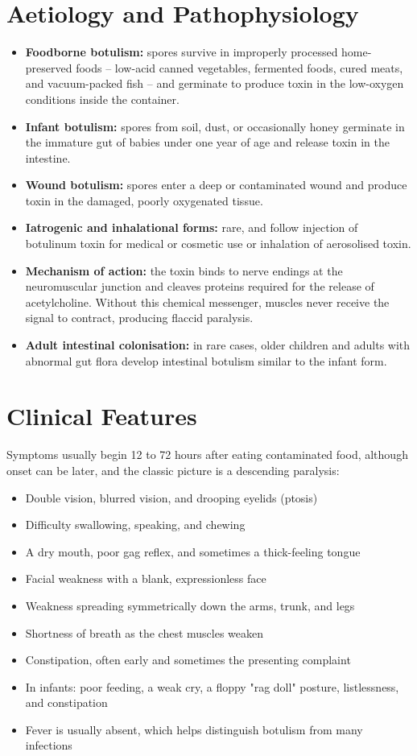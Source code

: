 \section*{Aetiology and Pathophysiology}
\begin{itemize}
    \item \textbf{Foodborne botulism:} spores survive in improperly processed home-preserved foods -- low-acid canned vegetables, fermented foods, cured meats, and vacuum-packed fish -- and germinate to produce toxin in the low-oxygen conditions inside the container.
    \item \textbf{Infant botulism:} spores from soil, dust, or occasionally honey germinate in the immature gut of babies under one year of age and release toxin in the intestine.
    \item \textbf{Wound botulism:} spores enter a deep or contaminated wound and produce toxin in the damaged, poorly oxygenated tissue.
    \item \textbf{Iatrogenic and inhalational forms:} rare, and follow injection of botulinum toxin for medical or cosmetic use or inhalation of aerosolised toxin.
    \item \textbf{Mechanism of action:} the toxin binds to nerve endings at the neuromuscular junction and cleaves proteins required for the release of acetylcholine. Without this chemical messenger, muscles never receive the signal to contract, producing flaccid paralysis.
    \item \textbf{Adult intestinal colonisation:} in rare cases, older children and adults with abnormal gut flora develop intestinal botulism similar to the infant form.
\end{itemize}

\section*{Clinical Features}
Symptoms usually begin 12 to 72 hours after eating contaminated food, although onset can be later, and the classic picture is a descending paralysis:
\begin{itemize}
    \item Double vision, blurred vision, and drooping eyelids (ptosis)
    \item Difficulty swallowing, speaking, and chewing
    \item A dry mouth, poor gag reflex, and sometimes a thick-feeling tongue
    \item Facial weakness with a blank, expressionless face
    \item Weakness spreading symmetrically down the arms, trunk, and legs
    \item Shortness of breath as the chest muscles weaken
    \item Constipation, often early and sometimes the presenting complaint
    \item In infants: poor feeding, a weak cry, a floppy "rag doll" posture, listlessness, and constipation
    \item Fever is usually absent, which helps distinguish botulism from many infections
\end{itemize}

